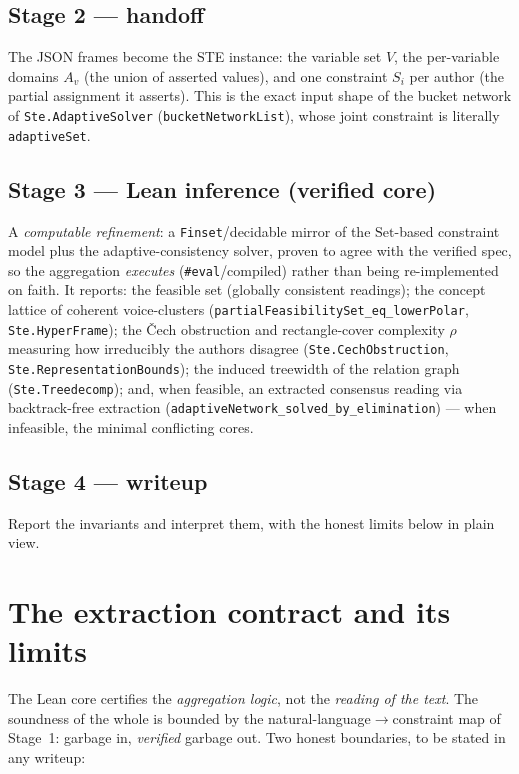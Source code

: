 \documentclass[11pt]{article}
\newcommand{\lean}[1]{\texttt{#1}}
\begin{document}
\subsection*{Stage 2 --- handoff}
The JSON frames become the STE instance: the variable set $V$, the
per-variable domains $A_v$ (the union of asserted values), and one
constraint $S_i$ per author (the partial assignment it asserts). This is
the exact input shape of the bucket network of \lean{Ste.AdaptiveSolver}
(\lean{bucketNetworkList}), whose joint constraint is literally
\lean{adaptiveSet}.

\subsection*{Stage 3 --- Lean inference (verified core)}
A \emph{computable refinement}: a \lean{Finset}/decidable mirror of the
$\mathrm{Set}$-based constraint model plus the adaptive-consistency solver,
proven to agree with the verified spec, so the aggregation
\emph{executes} (\lean{\#eval}/compiled) rather than being re-implemented
on faith. It reports: the feasible set (globally consistent readings); the
concept lattice of coherent voice-clusters
(\lean{partialFeasibilitySet\_eq\_lowerPolar}, \lean{Ste.HyperFrame}); the
Čech obstruction and rectangle-cover complexity $\rho$ measuring how
irreducibly the authors disagree (\lean{Ste.CechObstruction},
\lean{Ste.RepresentationBounds}); the induced treewidth of the relation
graph (\lean{Ste.Treedecomp}); and, when feasible, an extracted consensus
reading via backtrack-free extraction
(\lean{adaptiveNetwork\_solved\_by\_elimination}) --- when infeasible, the
minimal conflicting cores.

\subsection*{Stage 4 --- writeup}
Report the invariants and interpret them, with the honest limits below in
plain view.

\section{The extraction contract and its limits}

The Lean core certifies the \emph{aggregation logic}, not the
\emph{reading of the text}. The soundness of the whole is bounded by the
natural-language$\to$constraint map of Stage~1: garbage in, \emph{verified}
garbage out. Two honest boundaries, to be stated in any writeup:
\end{document}
